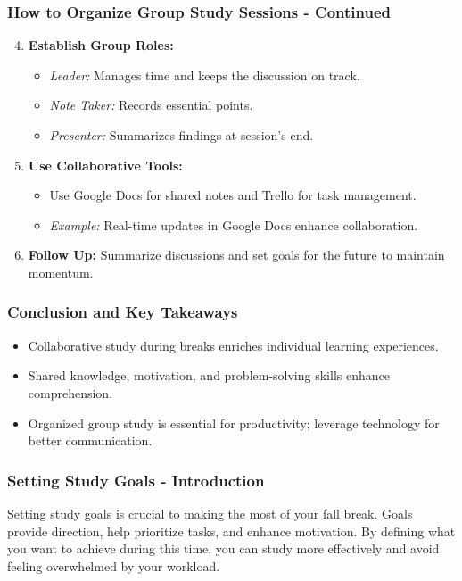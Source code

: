 \documentclass[aspectratio=169]{beamer}
\begin{document}
\begin{frame}[fragile]
    \frametitle{How to Organize Group Study Sessions - Continued}
    \begin{enumerate}
        \setcounter{enumi}{3}
        \item \textbf{Establish Group Roles:}
        \begin{itemize}
            \item \textit{Leader:} Manages time and keeps the discussion on track.
            \item \textit{Note Taker:} Records essential points.
            \item \textit{Presenter:} Summarizes findings at session's end.
        \end{itemize}
        
        \item \textbf{Use Collaborative Tools:}
        \begin{itemize}
            \item Use Google Docs for shared notes and Trello for task management.
            \item \textit{Example:} Real-time updates in Google Docs enhance collaboration.
        \end{itemize}
        
        \item \textbf{Follow Up:} Summarize discussions and set goals for the future to maintain momentum.
    \end{enumerate}
\end{frame}

\begin{frame}[fragile]
    \frametitle{Conclusion and Key Takeaways}
    \begin{itemize}
        \item Collaborative study during breaks enriches individual learning experiences.
        \item Shared knowledge, motivation, and problem-solving skills enhance comprehension.
        \item Organized group study is essential for productivity; leverage technology for better communication.
    \end{itemize}
\end{frame}

\begin{frame}[fragile]
    \frametitle{Setting Study Goals - Introduction}
    Setting study goals is crucial to making the most of your fall break. Goals provide direction, help prioritize tasks, and enhance motivation. By defining what you want to achieve during this time, you can study more effectively and avoid feeling overwhelmed by your workload.
\end{frame}
\end{document}
